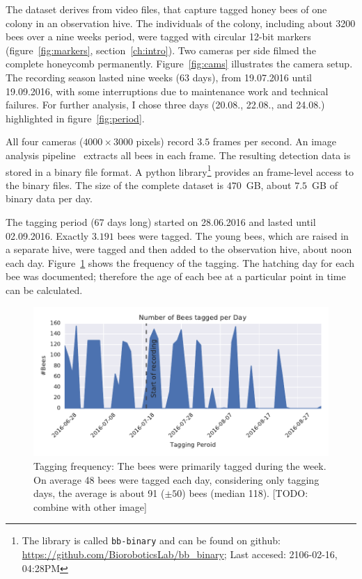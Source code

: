 The dataset derives from video files, that capture tagged honey bees of one colony in an observation hive.
The individuals of the colony, including about 3200 bees over a nine weeks period, were tagged with circular 12-bit markers (figure~\ref{fig:markers}, section~\ref{ch:intro}).
Two cameras per side filmed the complete honeycomb permanently. Figure~\ref{fig:cams} illustrates the camera setup.
The recording season lasted nine weeks (63 days), from 19.07.2016 until 19.09.2016, with some interruptions due to maintenance work and technical failures.
For further analysis, I chose three days (20.08., 22.08., and 24.08.) highlighted in figure~\ref{fig:period}.

All four cameras ($4000\times3000$ pixels) record $3.5$ frames per second. 
An image analysis pipeline~\cite{wario2015automatic} extracts all bees in each frame.
The resulting detection data is stored in a binary file format.
A python library\footnote{The library is called \texttt{bb-binary} and can be found on github: \url{https://github.com/BioroboticsLab/bb_binary}; Last accesed: 2106-02-16, 04:28PM} provides an frame-level access to the binary files.
The size of the complete dataset is $470$~GB, about $7.5$~GB of binary data per day.

The tagging period (67 days long) started on 28.06.2016 and lasted until 02.09.2016. Exactly $3.191$ bees were tagged. The young bees, which are raised in a separate hive, were tagged and then added to the observation hive, about noon each day. Figure~\ref{fig:tagging} shows the frequency of the tagging. The hatching day for each bee was documented; therefore the age of each bee at a particular point in time can be calculated.

\begin{figure}[htb]
	\centering
	\includegraphics[width=1.0\textwidth]{Figures/tagging_period}
	\caption[Tagging frequency]{Tagging frequency: The bees were primarily tagged during the week. On average 48 bees were tagged each day, considering only tagging days, the average is about 91 ($\pm50$) bees (median 118). [TODO: combine with other image]}
	\label{fig:tagging}
\end{figure}

